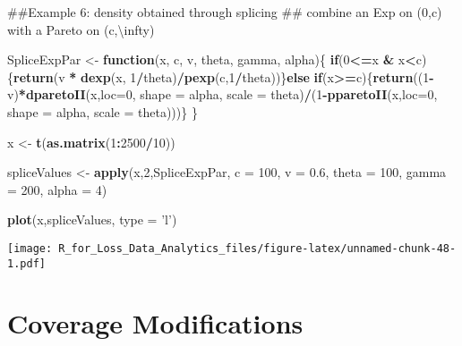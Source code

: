 \documentclass[]{book}
\newenvironment{Shaded}{\begin{snugshade}}{\end{snugshade}}
\newcommand{\KeywordTok}[1]{\textcolor[rgb]{0.13,0.29,0.53}{\textbf{#1}}}
\newcommand{\DataTypeTok}[1]{\textcolor[rgb]{0.13,0.29,0.53}{#1}}
\newcommand{\DecValTok}[1]{\textcolor[rgb]{0.00,0.00,0.81}{#1}}
\newcommand{\FloatTok}[1]{\textcolor[rgb]{0.00,0.00,0.81}{#1}}
\newcommand{\StringTok}[1]{\textcolor[rgb]{0.31,0.60,0.02}{#1}}
\newcommand{\ControlFlowTok}[1]{\textcolor[rgb]{0.13,0.29,0.53}{\textbf{#1}}}
\newcommand{\OperatorTok}[1]{\textcolor[rgb]{0.81,0.36,0.00}{\textbf{#1}}}
\newcommand{\NormalTok}[1]{#1}
\theoremstyle{definition}
\theoremstyle{definition}
\theoremstyle{definition}
\theoremstyle{remark}
\begin{document}
\begin{Shaded}
\begin{Highlighting}[]
\NormalTok{##Example 6: density obtained through splicing}
\NormalTok{## combine an Exp on (0,c) with a Pareto on (c,\textbackslash{}infty)}

\NormalTok{SpliceExpPar <-}\StringTok{ }\ControlFlowTok{function}\NormalTok{(x, c, v, theta, gamma, alpha)\{}
  \ControlFlowTok{if}\NormalTok{(}\DecValTok{0}\OperatorTok{<=}\NormalTok{x }\OperatorTok{&}\StringTok{ }\NormalTok{x}\OperatorTok{<}\NormalTok{c)\{}\KeywordTok{return}\NormalTok{(v }\OperatorTok{*}\StringTok{ }\KeywordTok{dexp}\NormalTok{(x, }\DecValTok{1}\OperatorTok{/}\NormalTok{theta)}\OperatorTok{/}\KeywordTok{pexp}\NormalTok{(c,}\DecValTok{1}\OperatorTok{/}\NormalTok{theta))\}}\ControlFlowTok{else}
    \ControlFlowTok{if}\NormalTok{(x}\OperatorTok{>=}\NormalTok{c)\{}\KeywordTok{return}\NormalTok{((}\DecValTok{1}\OperatorTok{-}\NormalTok{v)}\OperatorTok{*}\KeywordTok{dparetoII}\NormalTok{(x,}\DataTypeTok{loc=}\DecValTok{0}\NormalTok{, }\DataTypeTok{shape =}\NormalTok{ alpha, }\DataTypeTok{scale =}\NormalTok{ theta)}\OperatorTok{/}\NormalTok{(}\DecValTok{1}\OperatorTok{-}\KeywordTok{pparetoII}\NormalTok{(x,}\DataTypeTok{loc=}\DecValTok{0}\NormalTok{, }\DataTypeTok{shape =}\NormalTok{ alpha, }\DataTypeTok{scale =}\NormalTok{ theta)))\}}
\NormalTok{\}}

\NormalTok{x <-}\StringTok{ }\KeywordTok{t}\NormalTok{(}\KeywordTok{as.matrix}\NormalTok{(}\DecValTok{1}\OperatorTok{:}\DecValTok{2500}\OperatorTok{/}\DecValTok{10}\NormalTok{))}

\NormalTok{spliceValues <-}\StringTok{ }\KeywordTok{apply}\NormalTok{(x,}\DecValTok{2}\NormalTok{,SpliceExpPar, }\DataTypeTok{c =} \DecValTok{100}\NormalTok{, }\DataTypeTok{v =} \FloatTok{0.6}\NormalTok{, }\DataTypeTok{theta =} \DecValTok{100}\NormalTok{, }\DataTypeTok{gamma =} \DecValTok{200}\NormalTok{, }\DataTypeTok{alpha =} \DecValTok{4}\NormalTok{)}

\KeywordTok{plot}\NormalTok{(x,spliceValues, }\DataTypeTok{type =} \StringTok{'l'}\NormalTok{)}
\end{Highlighting}
\end{Shaded}

\texttt{[image: R\_for\_Loss\_Data\_Analytics\_files/figure-latex/unnamed-chunk-48-1.pdf]}

\section{Coverage Modifications}\label{coverage-modifications}
\end{document}
